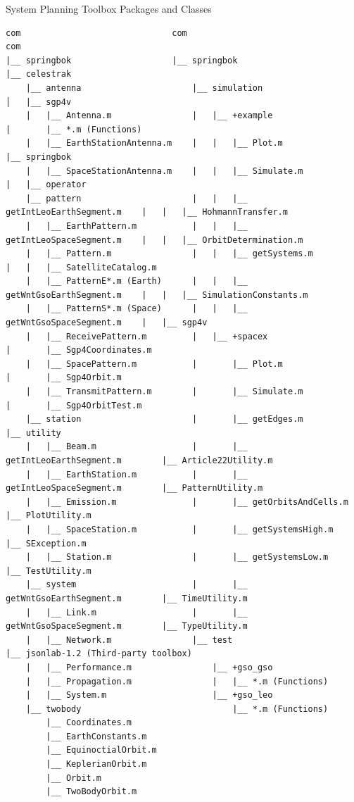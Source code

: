 \documentclass[11pt]{article}
\begin{document}
\begin{landscape}
  \begin{table}
    \caption{System Planning Toolbox Packages and Classes}\label{table-packages-and-classes}
\small
\begin{verbatim}
com                              com                                        com
|__ springbok                    |__ springbok                              |__ celestrak
    |__ antenna                      |__ simulation                         │   |__ sgp4v
    |   |__ Antenna.m                |   |__ +example                       |       |__ *.m (Functions)
    |   |__ EarthStationAntenna.m    |   |   |__ Plot.m                     |__ springbok
    |   |__ SpaceStationAntenna.m    |   |   |__ Simulate.m                 |   |__ operator
    |__ pattern                      |   |   |__ getIntLeoEarthSegment.m    |   |   |__ HohmannTransfer.m
    |   |__ EarthPattern.m           |   |   |__ getIntLeoSpaceSegment.m    |   |   |__ OrbitDetermination.m
    |   |__ Pattern.m                |   |   |__ getSystems.m               |   |   |__ SatelliteCatalog.m
    |   |__ PatternE*.m (Earth)      |   |   |__ getWntGsoEarthSegment.m    |   |   |__ SimulationConstants.m
    |   |__ PatternS*.m (Space)      |   |   |__ getWntGsoSpaceSegment.m    |   |__ sgp4v
    |   |__ ReceivePattern.m         |   |__ +spacex                        |       |__ Sgp4Coordinates.m
    |   |__ SpacePattern.m           |       |__ Plot.m                     |       |__ Sgp4Orbit.m
    |   |__ TransmitPattern.m        |       |__ Simulate.m                 |       |__ Sgp4OrbitTest.m
    |__ station                      |       |__ getEdges.m                 |__ utility                              
    |   |__ Beam.m                   |       |__ getIntLeoEarthSegment.m        |__ Article22Utility.m               
    |   |__ EarthStation.m           |       |__ getIntLeoSpaceSegment.m        |__ PatternUtility.m                 
    |   |__ Emission.m               |       |__ getOrbitsAndCells.m            |__ PlotUtility.m                    
    |   |__ SpaceStation.m           |       |__ getSystemsHigh.m               |__ SException.m                     
    |   |__ Station.m                |       |__ getSystemsLow.m                |__ TestUtility.m                    
    |__ system                       |       |__ getWntGsoEarthSegment.m        |__ TimeUtility.m                    
    |   |__ Link.m                   |       |__ getWntGsoSpaceSegment.m        |__ TypeUtility.m                    
    |   |__ Network.m                |__ test                                   |__ jsonlab-1.2 (Third-party toolbox)
    |   |__ Performance.m                |__ +gso_gso
    |   |__ Propagation.m                |   |__ *.m (Functions)
    |   |__ System.m                     |__ +gso_leo
    |__ twobody                              |__ *.m (Functions)
        |__ Coordinates.m            
        |__ EarthConstants.m         
        |__ EquinoctialOrbit.m       
        |__ KeplerianOrbit.m         
        |__ Orbit.m                  
        |__ TwoBodyOrbit.m           
\end{verbatim}
  \end{table}
\end{landscape}
\end{document}
